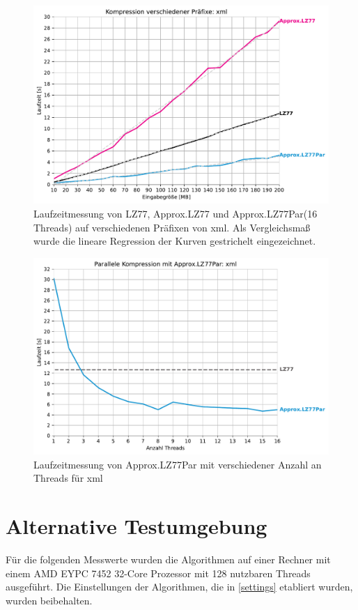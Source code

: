 \begin{figure}[H]
    \centering
    \caption{Laufzeitmessung von LZ77, Approx.LZ77 und Approx.LZ77Par(16 Threads) auf verschiedenen Präfixen von xml. Als Vergleichsmaß wurde 
    die lineare Regression der Kurven gestrichelt eingezeichnet.}
    \includegraphics[scale=0.65]{Images/progressive_xml.pdf}
\end{figure}

\begin{figure}[H]
    \centering
    \caption{Laufzeitmessung von Approx.LZ77Par mit verschiedener Anzahl an Threads für xml}
    \includegraphics[scale=0.65]{Images/progressive_speedup_xml.pdf}
\end{figure}
\pagebreak
\section{Alternative Testumgebung}
Für die folgenden Messwerte wurden die Algorithmen auf einer Rechner mit einem AMD EYPC 7452 32-Core Prozessor mit 128 nutzbaren Threads ausgeführt.
Die Einstellungen der Algorithmen, die in \ref{settings} etabliert wurden, wurden beibehalten.

